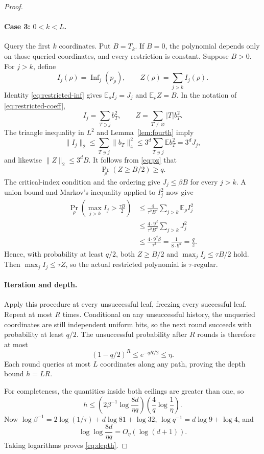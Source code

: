\documentclass[11pt]{article}
\newcommand{\E}{\mathbb E}
\newcommand{\Inf}{\operatorname{Inf}}
\newcommand{\1}{\mathbf 1}
\theoremstyle{definition}
\theoremstyle{remark}
\numberwithin{equation}{section}
\begin{document}
\begin{proof}
\paragraph{Case 3: $0<k<L$.}
Query the first $k$ coordinates. Put $B=T_k$. If $B=0$, the polynomial depends only on those queried coordinates, and every restriction is constant. Suppose $B>0$. For $j>k$, define
\[
 I_j(\rho)=\Inf_j(p_\rho),\qquad Z(\rho)=\sum_{j>k}I_j(\rho).
\]
Identity \eqref{eq:restricted-inf} gives $\E_\rho I_j=J_j$ and $\E_\rho Z=B$. In the notation of \eqref{eq:restricted-coeff},
\[
 I_j=\sum_{T\ni j}b_T^2,\qquad
 Z=\sum_{T\ne\varnothing}|T|b_T^2.
\]
The triangle inequality in $L^2$ and Lemma~\ref{lem:fourth} imply
\[
 \|I_j\|_2\le\sum_{T\ni j}\|b_T\|_4^2
 \le3^d\sum_{T\ni j}\E b_T^2=3^dJ_j,
\]
and likewise $\|Z\|_2\le3^dB$. It follows from \eqref{eq:pz} that
\[
 \Pr_\rho(Z\ge B/2)\ge q.
\]
The critical-index condition and the ordering give $J_j\le\beta B$ for every $j>k$. A union bound and Markov's inequality applied to $I_j^2$ now give
\begin{align*}
 \Pr_\rho\left(\max_{j>k}I_j>\frac{\tau B}{2}\right)
 &\le\frac4{\tau^2B^2}\sum_{j>k}\E_\rho I_j^2\\
 &\le\frac{4\cdot9^d}{\tau^2B^2}\sum_{j>k}J_j^2\\
 &\le\frac{4\cdot9^d\beta}{\tau^2}
 =\frac1{8\cdot9^d}=\frac q2.
\end{align*}
Hence, with probability at least $q/2$, both $Z\ge B/2$ and $\max_jI_j\le\tau B/2$ hold. Then $\max_jI_j\le\tau Z$, so the actual restricted polynomial is $\tau$-regular.

\paragraph{Iteration and depth.}
Apply this procedure at every unsuccessful leaf, freezing every successful leaf. Repeat at most $R$ times. Conditional on any unsuccessful history, the unqueried coordinates are still independent uniform bits, so the next round succeeds with probability at least $q/2$. The unsuccessful probability after $R$ rounds is therefore at most
\[
 (1-q/2)^R\le e^{-qR/2}\le\eta.
\]
Each round queries at most $L$ coordinates along any path, proving the depth bound $h=LR$.

For completeness, the quantities inside both ceilings are greater than one, so
\[
 h\le\left(2\beta^{-1}\log\frac{8d}{\eta q}\right)
       \left(\frac4q\log\frac1\eta\right).
\]
Now $\log\beta^{-1}=2\log(1/\tau)+d\log81+\log32$, $\log q^{-1}=d\log9+\log4$, and
\[
 \log\log\frac{8d}{\eta q}=O_\eta(\log(d+1)).
\]
Taking logarithms proves \eqref{eq:depth}.
\end{proof}
\end{document}
